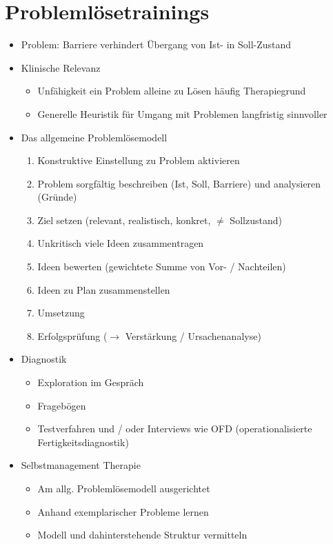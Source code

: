 \documentclass[11pt, paper=a4, twocolumn]{scrartcl}
\begin{document}
	\section{Problemlösetrainings}
		\begin{itemize}
			\item Problem: Barriere verhindert Übergang von Ist- in Soll-Zustand
			\item Klinische Relevanz
				\begin{itemize}
					\item Unfähigkeit ein Problem alleine zu Lösen häufig Therapiegrund
					\item Generelle Heuristik für Umgang mit Problemen langfristig sinnvoller
				\end{itemize}
			\item Das allgemeine Problemlösemodell
				\begin{enumerate}
					\item Konstruktive Einstellung zu Problem aktivieren
					\item Problem sorgfältig beschreiben (Ist, Soll, Barriere) und analysieren (Gründe)
					\item Ziel setzen (relevant, realistisch, konkret, $\neq$ Sollzustand)
					\item Unkritisch viele Ideen zusammentragen
					\item Ideen bewerten (gewichtete Summe von Vor- / Nachteilen)
					\item Ideen zu Plan zusammenstellen
					\item Umsetzung
					\item Erfolgsprüfung ($\rightarrow$ Verstärkung / Ursachenanalyse)
				\end{enumerate}
			\item Diagnostik
				\begin{itemize}
					\item Exploration im Gespräch
					\item Fragebögen
					\item Testverfahren und / oder Interviews wie OFD (operationalisierte Fertigkeitsdiagnostik)
				\end{itemize}
			\item Selbstmanagement Therapie
				\begin{itemize}
					\item Am allg. Problemlösemodell ausgerichtet
					\item Anhand exemplarischer Probleme lernen
					\item Modell und dahinterstehende Struktur vermitteln

\end{itemize}
\end{itemize}
\end{document}
